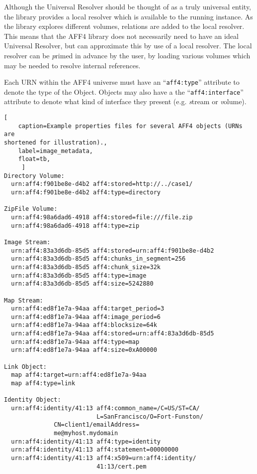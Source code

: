 \documentclass[10pt, conference]{IEEEtran}
\begin{document}
Although the Universal Resolver should be thought of as a truly
universal entity, the library provides a local resolver which is
available to the running instance. As the library explores different
volumes, relations are added to the local resolver. This means that
the AFF4 library does not necessarily need to have an ideal Universal
Resolver, but can approximate this by use of a local resolver. The
local resolver can be {\emph primed} in advance by the user, by
loading various volumes which may be needed to resolve internal
references.

Each URN within the AFF4 universe must have an ``\texttt{aff4:type}''
attribute to denote the type of the Object. Objects may also have a
the ``\texttt{aff4:interface}'' attribute to denote what kind of
interface they present (e.g. {\emph stream} or {\emph volume}).

\begin{lstlisting}[
	caption=Example properties files for several AFF4 objects (URNs are
shortened for illustration).,
	label=image_metadata,
	float=tb,
	 ]
Directory Volume:
  urn:aff4:f901be8e-d4b2 aff4:stored=http://../case1/
  urn:aff4:f901be8e-d4b2 aff4:type=directory

ZipFile Volume:
  urn:aff4:98a6dad6-4918 aff4:stored=file:///file.zip
  urn:aff4:98a6dad6-4918 aff4:type=zip

Image Stream:
  urn:aff4:83a3d6db-85d5 aff4:stored=urn:aff4:f901be8e-d4b2
  urn:aff4:83a3d6db-85d5 aff4:chunks_in_segment=256
  urn:aff4:83a3d6db-85d5 aff4:chunk_size=32k
  urn:aff4:83a3d6db-85d5 aff4:type=image
  urn:aff4:83a3d6db-85d5 aff4:size=5242880

Map Stream:
  urn:aff4:ed8f1e7a-94aa aff4:target_period=3
  urn:aff4:ed8f1e7a-94aa aff4:image_period=6
  urn:aff4:ed8f1e7a-94aa aff4:blocksize=64k
  urn:aff4:ed8f1e7a-94aa aff4:stored=urn:aff4:83a3d6db-85d5
  urn:aff4:ed8f1e7a-94aa aff4:type=map
  urn:aff4:ed8f1e7a-94aa aff4:size=0xA00000

Link Object:
  map aff4:target=urn:aff4:ed8f1e7a-94aa
  map aff4:type=link

Identity Object:
  urn:aff4:identity/41:13 aff4:common_name=/C=US/ST=CA/
                          L=SanFrancisco/O=Fort-Funston/
			  CN=client1/emailAddress=
			  me@myhost.mydomain
  urn:aff4:identity/41:13 aff4:type=identity
  urn:aff4:identity/41:13 aff4:statement=00000000
  urn:aff4:identity/41:13 aff4:x509=urn:aff4:identity/
                          41:13/cert.pem
\end{lstlisting}
\end{document}
